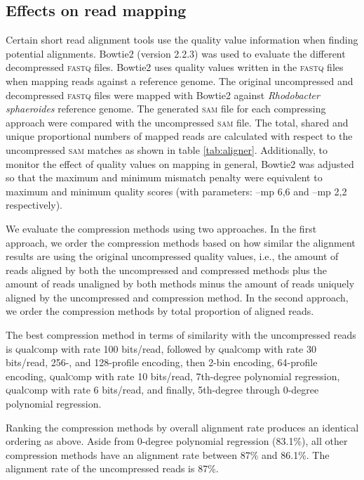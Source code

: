 \subsection{Effects on read mapping}

Certain short read alignment tools use the quality value
information when finding potential alignments. Bowtie2 (version 2.2.3)
was used to evaluate the different decompressed \textsc{fastq}
files. Bowtie2 uses quality values written in the \textsc{fastq} files
when mapping reads against a reference genome. The original
uncompressed and decompressed \textsc{fastq} files were mapped with
Bowtie2 against \textit{Rhodobacter sphaeroides} reference genome. The
generated \textsc{sam} file for each compressing approach were
compared with the uncompressed \textsc{sam} file. The total, shared
and unique proportional numbers of mapped reads are calculated with
respect to the uncompressed \textsc{sam} matches as shown in table
\ref{tab:aligner}. Additionally, to monitor the effect of quality
values on mapping in general, Bowtie2 was adjusted so that the maximum
and minimum mismatch penalty were equivalent to maximum and minimum
quality scores (with parameters: --mp 6,6 and --mp 2,2 respectively).

We evaluate the compression methods using two approaches. In the
first approach, we order the compression methods based on how similar
the alignment results are using the original uncompressed quality values, i.e., the
amount of reads aligned by both the uncompressed and compressed
methods plus the amount of reads unaligned by both methods minus the
amount of reads uniquely aligned by the uncompressed and compression
method. In the second approach, we order the compression methods by
total proportion of aligned reads.

The best compression method in terms of similarity with the
uncompressed reads is \textsc{q}ual\textsc{c}omp with rate 100 bits/read, followed by
\textsc{q}ual\textsc{c}omp with rate 30 bits/read, 256-, and 128-profile encoding, then
2-bin encoding, 64-profile encoding, \textsc{q}ual\textsc{c}omp with rate 10 bits/read,
7th-degree polynomial regression, \textsc{q}ual\textsc{c}omp with rate 6 bits/read, and
finally, 5th-degree through 0-degree polynomial regression.

Ranking the compression methods by overall alignment rate produces an
identical ordering as above. Aside from 0-degree polynomial
regression (83.1\%), all other compression methods have an alignment
rate between 87\% and 86.1\%. The alignment rate of the uncompressed
reads is 87\%.

